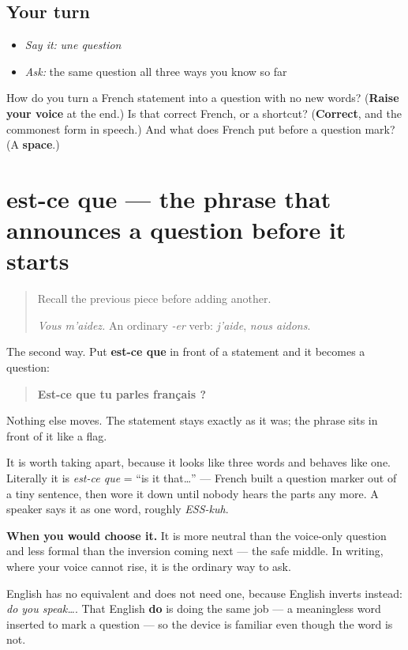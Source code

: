 \subsection*{Your turn}
\begin{itemize}
\raggedright
  \item \emph{Say it:} \emph{une question}
  \item \emph{Ask:} the same question all three ways you know so far
\end{itemize}

\begin{tcolorbox}[breakable,colback=teal!4,colframe=teal!35!black,title={Before you move on}]
How do you turn a French statement into a question with no new words? (\textbf{Raise your voice} at the end.) Is that correct French, or a shortcut? (\textbf{Correct}, and the commonest form in speech.) And what does French put before a question mark? (A \textbf{space}.)
\end{tcolorbox}
\section[est-ce que]{est-ce que — the phrase that announces a question before it starts}

\label{lesson:FR-C32-est-ce-que}



\begin{quote}
Recall the previous piece before adding another.

\emph{Vous m'aidez.} An ordinary \emph{-er} verb: \emph{j'aide}, \emph{nous aidons}.
\end{quote}

\begin{cousinweb}
The second way. Put \textbf{est-ce que} in front of a statement and it becomes a question:

\begin{quote}
\textbf{Est-ce que tu parles français ?}
\end{quote}

Nothing else moves. The statement stays exactly as it was; the phrase sits in front of it like a flag.

It is worth taking apart, because it looks like three words and behaves like one. Literally it is \emph{est-ce que} = \textquotedblleft{}is it that…\textquotedblright{} — French built a question marker out of a tiny sentence, then wore it down until nobody hears the parts any more. A speaker says it as one word, roughly \emph{ESS-kuh}.

\textbf{When you would choose it.} It is more neutral than the voice-only question and less formal than the inversion coming next — the safe middle. In writing, where your voice cannot rise, it is the ordinary way to ask.

English has no equivalent and does not need one, because English inverts instead: \emph{do you speak…}. That English \textbf{do} is doing the same job — a meaningless word inserted to mark a question — so the device is familiar even though the word is not.
\end{cousinweb}

